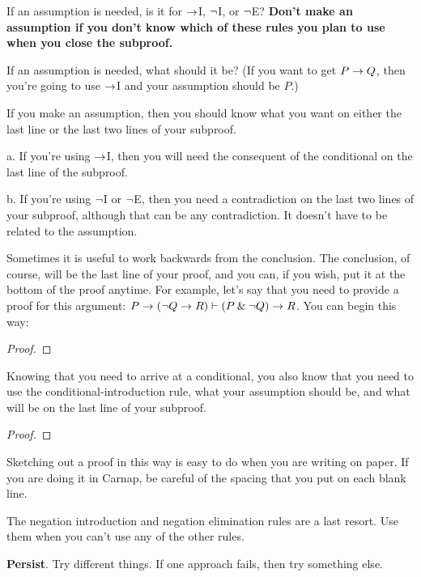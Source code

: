 \begin{earg}
\item[\ex{18-4}] If an assumption is needed, is it for $\rightarrow$I, ${\neg}$I, or ${\neg}$E? \textbf{Don't make an assumption if you don't know which of these rules you plan to use when you close the subproof.}
\medskip

\item[\ex{18-5}] If an assumption is needed, what should it be? (If you want to get $P \rightarrow Q$, then you’re going to use $\rightarrow$I and your assumption should be $P$.)
\medskip

\item[\ex{18-6}] If you make an assumption, then you should know what you want on either the last line or the last two lines of your subproof.
\begin{earg}
\item[a.] If you’re using $\rightarrow$I, then you will need the consequent of the conditional on the last line of the subproof. 
\item[b.] If you’re using ${\neg}$I or ${\neg}$E, then you need a contradiction on the last two lines of your subproof, although that can be any contradiction. It doesn't have to be related to the assumption.
\end{earg}
\medskip

\item[\ex{18-3a}] Sometimes it is useful to work backwards from the conclusion. The conclusion, of course, will be the last line of your proof, and you can, if you wish, put it at the bottom of the proof anytime. For example, let's say that you need to provide a proof for this argument: $P \rightarrow ({\neg} Q \rightarrow R) \vdash (P \mathbin{\&} {\neg} Q) \rightarrow R$. You can begin this way:
\begin{proof}
	 \pr{}
\end{proof}
\medskip

Knowing that you need to arrive at a conditional, you also know that you need to use the conditional-introduction rule, what your assumption should be, and what will be on the last line of your subproof.

\begin{proof}
	 \pr{}
	\open
		\as{}
	\close
	\ci{}
\end{proof}

Sketching out a proof in this way is easy to do when you are writing on paper. If you are doing it in Carnap, be careful of the spacing that you put on each blank line.

\medskip

\item[\ex{18-7}] The negation introduction and negation elimination rules are a last resort. Use them when you can't use any of the other rules.
\medskip

\item[\ex{18-8}] \textbf{Persist}. Try different things. If one approach fails, then try something else.
\end{earg}



